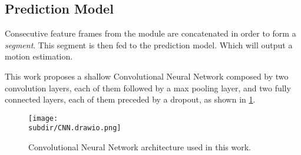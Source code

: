 \subsection{Prediction Model} \label{subsec:prediction-model}

Consecutive feature frames from the  module
are concatenated in order to form a \emph{segment}. This segment is then fed to
the prediction model. Which will output a motion estimation.

This work proposes a shallow Convolutional Neural Network \cite{FukushimaCNN}
composed by two convolution layers, each of them followed by a max pooling
layer, and two fully connected layers, each of them preceded by a dropout, as
shown in \cref{fig:model-arch-cnn}. 

\begin{figure}
    \centering
    \texttt{[image: \\subdir/CNN.drawio.png]}
    \caption{Convolutional Neural Network architecture used in this work.}
    \label{fig:model-arch-cnn}
\end{figure}






